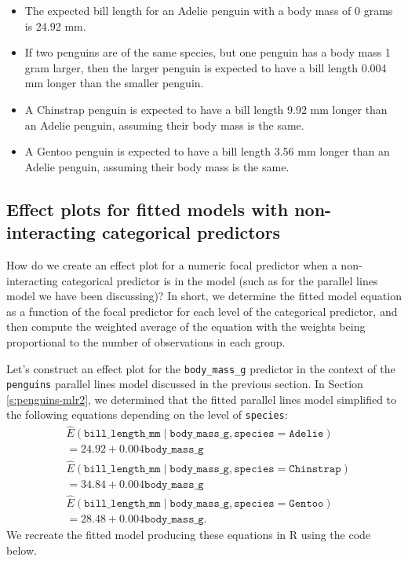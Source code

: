 \documentclass[
]{book}
\providecommand{\tightlist}{%
  \setlength{\itemsep}{0pt}\setlength{\parskip}{0pt}}
\theoremstyle{definition}
\theoremstyle{definition}
\theoremstyle{definition}
\theoremstyle{definition}
\theoremstyle{remark}
\begin{document}
\begin{itemize}
\tightlist
\item
  The expected bill length for an Adelie penguin with a body mass of 0
  grams is 24.92 mm.
\item
  If two penguins are of the same species, but one penguin has a body
  mass 1 gram larger, then the larger penguin is expected to have a
  bill length 0.004 mm longer than the smaller penguin.
\item
  A Chinstrap penguin is expected to have a bill length 9.92 mm longer
  than an Adelie penguin, assuming their body mass is the same.
\item
  A Gentoo penguin is expected to have a bill length 3.56 mm longer
  than an Adelie penguin, assuming their body mass is the same.
\end{itemize}

\hypertarget{effect-plots-for-fitted-models-with-non-interacting-categorical-predictors}{%
\subsection{Effect plots for fitted models with non-interacting categorical predictors}\label{effect-plots-for-fitted-models-with-non-interacting-categorical-predictors}}

How do we create an effect plot for a numeric focal predictor when a
non-interacting categorical predictor is in the model (such as for the
parallel lines model we have been discussing)? In short, we determine
the fitted model equation as a function of the focal predictor for each level of
the categorical predictor, and then compute the weighted average of the
equation with the weights being proportional to the number of
observations in each group.

Let's construct an effect plot for the \texttt{body\_mass\_g} predictor in the
context of the \texttt{penguins} parallel lines model discussed in the previous
section. In Section \ref{s:penguins-mlr2}, we determined that the
fitted parallel lines model simplified to the following equations
depending on the level of \texttt{species}: \[
\begin{aligned}
&\hat{E}(\mathtt{bill\_length\_mm} \mid \mathtt{body\_mass\_g}, \mathtt{species}=\mathtt{Adelie}) \\
&= 24.92 + 0.004 \mathtt{body\_mass\_g} \\
&\hat{E}(\mathtt{bill\_length\_mm} \mid \mathtt{body\_mass\_g}, \mathtt{species}=\mathtt{Chinstrap}) \\
&= 34.84 + 0.004 \mathtt{body\_mass\_g} \\
&\hat{E}(\mathtt{bill\_length\_mm} \mid \mathtt{body\_mass\_g}, \mathtt{species}=\mathtt{Gentoo}) \\
&= 28.48 + 0.004 \mathtt{body\_mass\_g}.
\end{aligned}
\label{eq:pl-equations}
\] We recreate the fitted model producing these equations in R using the
code below.
\end{document}
